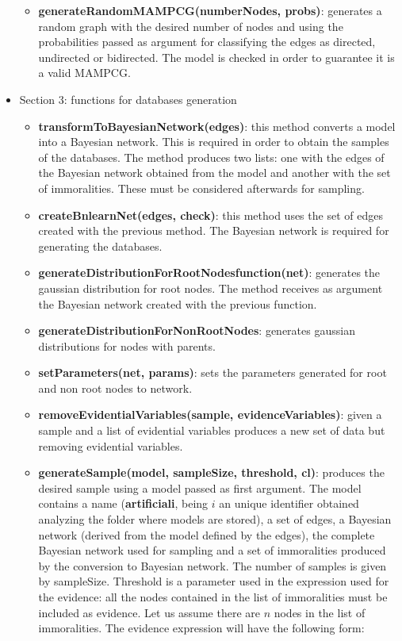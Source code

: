\documentclass[11pt,professionalfont]{article}
\begin{document}
\begin{itemize}
\begin{itemize}
	\item \textbf{generateRandomMAMPCG(numberNodes, probs)}: generates a random
			graph with the desired number of nodes and using the probabilities
			passed as argument for classifying the edges as directed, undirected
			or bidirected. The model is checked in order to guarantee it is a
			valid MAMPCG.
  \end{itemize}

\item Section 3: functions for databases generation

  \begin{itemize} 

	\item \textbf{transformToBayesianNetwork(edges)}: this method
			converts a model into a Bayesian network. This is required in order
			to obtain the samples of the databases. The method produces two
			lists: one with the edges of the Bayesian network obtained from the
			model and another with the set of immoralities. These must be 
			considered afterwards for sampling.

	\item \textbf{createBnlearnNet(edges, check)}: this method uses the set of
			edges created with the previous method. The Bayesian network is
			required for generating the databases.

	\item \textbf{generateDistributionForRootNodesfunction(net)}: generates the
			gaussian distribution for root nodes. The method receives as
			argument the Bayesian network created with the previous function.

	\item \textbf{generateDistributionForNonRootNodes}: generates gaussian
			distributions for nodes with parents. 

	\item \textbf{setParameters(net, params)}: sets the parameters generated for
			root and non root nodes to network.

	\item \textbf{removeEvidentialVariables(sample, evidenceVariables)}: given a
			sample and a list of evidential variables produces a new set of data
			but removing evidential variables.

	\item \textbf{generateSample(model, sampleSize, threshold, cl)}: produces 
			the desired sample using a model passed as first argument. The model
			contains a name (\textbf{artificiali}, being $i$ an unique
			identifier obtained analyzing the folder where models are stored),
			a set of edges, a Bayesian network (derived from the model defined
			by the edges), the complete Bayesian network used for sampling and a 
			set of immoralities produced by the conversion to Bayesian network. The 
			number of samples is given by sampleSize. Threshold is a parameter used in 
			the expression used for the evidence: all the nodes contained in the list 
			of immoralities	 must be included as evidence. Let us assume there are $n$ 
			nodes in the list of immoralities. The evidence expression will have
			the following form:


\end{itemize}
\end{itemize}
\end{document}
